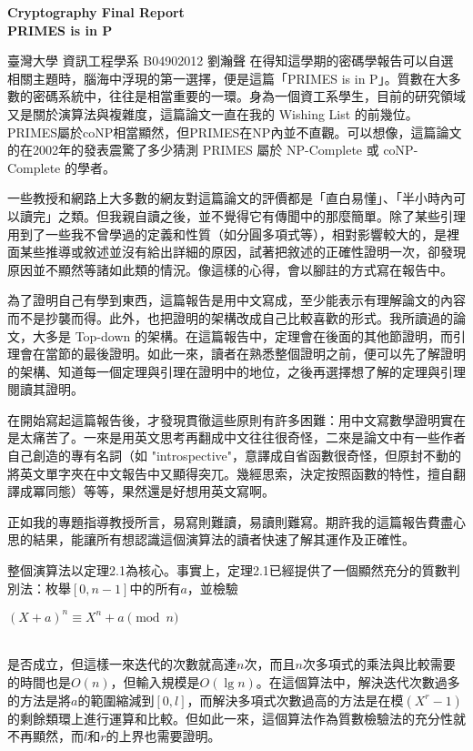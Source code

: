 \documentclass{article}
\begin{document}
\fontsize{12pt}{20pt}\selectfont
\begin{center}
	\bfseries\huge{Cryptography Final Report\\PRIMES is in P}\\
\end{center}
{
    \hfill 臺灣大學 資訊工程學系 B04902012 劉瀚聲
}
\indent    在得知這學期的密碼學報告可以自選相關主題時，腦海中浮現的第一選擇，便是這篇「PRIMES is in P」。質數在大多數的密碼系統中，往往是相當重要的一環。身為一個資工系學生，目前的研究領域又是關於演算法與複雜度，這篇論文一直在我的 Wishing List 的前幾位。PRIMES屬於coNP相當顯然，但PRIMES在NP內並不直觀。可以想像，這篇論文的在2002年的發表震驚了多少猜測 PRIMES 屬於 NP-Complete 或 coNP-Complete 的學者。

    一些教授和網路上大多數的網友對這篇論文的評價都是「直白易懂」、「半小時內可以讀完」之類。但我親自讀之後，並不覺得它有傳聞中的那麼簡單。除了某些引理用到了一些我不曾學過的定義和性質（如分圓多項式等），相對影響較大的，是裡面某些推導或敘述並沒有給出詳細的原因，試著把敘述的正確性證明一次，卻發現原因並不顯然等諸如此類的情況。像這樣的心得，會以腳註的方式寫在報告中。

    為了證明自己有學到東西，這篇報告是用中文寫成，至少能表示有理解論文的內容而不是抄襲而得。此外，也把證明的架構改成自己比較喜歡的形式。我所讀過的論文，大多是 Top-down 的架構。在這篇報告中，定理會在後面的其他節證明，而引理會在當節的最後證明。如此一來，讀者在熟悉整個證明之前，便可以先了解證明的架構、知道每一個定理與引理在證明中的地位，之後再選擇想了解的定理與引理閱讀其證明。

    在開始寫起這篇報告後，才發現貫徹這些原則有許多困難：用中文寫數學證明實在是太痛苦了。一來是用英文思考再翻成中文往往很奇怪，二來是論文中有一些作者自己創造的專有名詞（如 "introspective"，意譯成自省函數很奇怪，但原封不動的將英文單字夾在中文報告中又顯得突兀。幾經思索，決定按照函數的特性，擅自翻譯成冪同態）等等，果然還是好想用英文寫啊。

    正如我的專題指導教授所言，易寫則難讀，易讀則難寫。期許我的這篇報告費盡心思的結果，能讓所有想認識這個演算法的讀者快速了解其運作及正確性。

    整個演算法以定理2.1為核心。事實上，定理2.1已經提供了一個顯然充分的質數判別法：枚舉$[0,n-1]$中的所有$a$，並檢驗\\
    \centerline{$(X+a)^n\equiv X^n+a \pmod{n}$}\\
    是否成立，但這樣一來迭代的次數就高達$n$次，而且$n$次多項式的乘法與比較需要的時間也是$O(n)$，但輸入規模是$O(\lg n)$。在這個算法中，解決迭代次數過多的方法是將$a$的範圍縮減到$[0,l]$，而解決多項式次數過高的方法是在模$(X^r-1)$的剩餘類環上進行運算和比較。但如此一來，這個算法作為質數檢驗法的充分性就不再顯然，而$l$和$r$的上界也需要證明。
\end{document}
